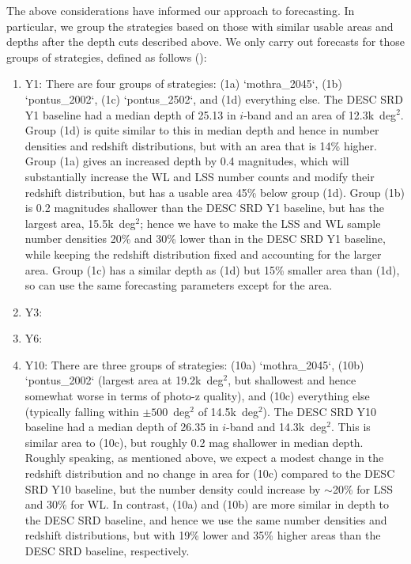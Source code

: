The above considerations have informed our approach to forecasting.  In particular, we group the
strategies based on those with similar usable areas and depths after the depth cuts described
above.  We only carry out forecasts for those groups of strategies, defined as follows
():
\begin{enumerate}
\item Y1: There are four groups of strategies: (1a) `mothra\_2045`, (1b) `pontus\_2002`, (1c)
  `pontus\_2502`, and (1d) everything else.  The DESC SRD Y1 baseline had a median depth of 25.13 in
  $i$-band and an area of 12.3k~deg$^2$.  Group (1d) is quite similar to this in median depth and
  hence in number densities and redshift distributions, but with an area that is 14\% higher.  Group
  (1a) gives an increased depth by 0.4 magnitudes, which will substantially increase the WL and LSS
  number counts and modify their redshift distribution, but has a usable area 45\% below group (1d).
  Group (1b) is 0.2 magnitudes shallower than the DESC SRD Y1 baseline, but has the largest area,
  15.5k~deg$^2$; hence we have to make the LSS and WL sample number densities 20\% and 30\% lower
  than in the DESC SRD Y1 baseline, while keeping the redshift distribution fixed and accounting for
  the larger area.   Group (1c) has a similar depth as (1d) but 15\% smaller area than (1d), so can
  use the same forecasting parameters except for the area.
\item Y3: \todorm{}
\item Y6: \todorm{}
\item Y10: There are three groups of strategies: (10a) `mothra\_2045`, (10b) `pontus\_2002` (largest
  area at 19.2k~deg$^2$, but shallowest and hence somewhat worse in terms of photo-z quality), and (10c)
  everything else (typically falling within $\pm 500$~deg$^2$ of 14.5k~deg$^2$).  The DESC SRD Y10
  baseline had a median depth of 26.35 in $i$-band and 14.3k~deg$^2$.  This is similar area to
  (10c), but roughly 0.2 mag shallower in median depth.  Roughly speaking, as mentioned above, we
  expect a modest change in the redshift distribution and no change in area for (10c) compared to
  the DESC SRD Y10 baseline, but the number density could increase by $\sim$20\% for LSS and $30$\%
  for WL.  In contrast, (10a) and (10b) are more similar in depth to the DESC SRD baseline, and
  hence we use the same number densities and redshift distributions, but with 19\% lower and 35\%
  higher areas than the DESC SRD baseline, respectively.
\end{enumerate}


